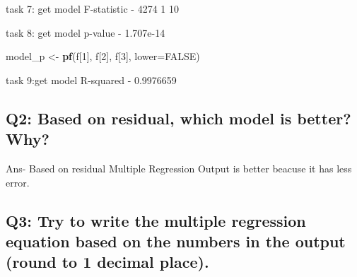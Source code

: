 \documentclass[
]{article}
\newenvironment{Shaded}{\begin{snugshade}}{\end{snugshade}}
\newcommand{\AttributeTok}[1]{\textcolor[rgb]{0.13,0.29,0.53}{#1}}
\newcommand{\ConstantTok}[1]{\textcolor[rgb]{0.56,0.35,0.01}{#1}}
\newcommand{\DecValTok}[1]{\textcolor[rgb]{0.00,0.00,0.81}{#1}}
\newcommand{\FunctionTok}[1]{\textcolor[rgb]{0.13,0.29,0.53}{\textbf{#1}}}
\newcommand{\NormalTok}[1]{#1}
\newcommand{\OtherTok}[1]{\textcolor[rgb]{0.56,0.35,0.01}{#1}}
\newcommand{\SpecialCharTok}[1]{\textcolor[rgb]{0.81,0.36,0.00}{\textbf{#1}}}
\begin{document}
task 7: get model F-statistic - 4274 1 10

\begin{Shaded}
\end{Shaded}

task 8: get model p-value - 1.707e-14

\begin{Shaded}
\begin{Highlighting}[]
\NormalTok{model\_p }\OtherTok{\textless{}{-}} \FunctionTok{pf}\NormalTok{(f[}\DecValTok{1}\NormalTok{], f[}\DecValTok{2}\NormalTok{], f[}\DecValTok{3}\NormalTok{], }\AttributeTok{lower=}\ConstantTok{FALSE}\NormalTok{) }
\end{Highlighting}
\end{Shaded}

task 9:get model R-squared - 0.9976659

\begin{Shaded}
\end{Shaded}

\hypertarget{q2-based-on-residual-which-model-is-better-why}{%
\subsection{Q2: Based on residual, which model is better?
Why?}\label{q2-based-on-residual-which-model-is-better-why}}

Ans- Based on residual Multiple Regression Output is better beacuse it
has less error.

\hypertarget{q3-try-to-write-the-multiple-regression-equation-based-on-the-numbers-in-the-output-round-to-1-decimal-place.}{%
\subsection{Q3: Try to write the multiple regression equation based on
the numbers in the output (round to 1 decimal
place).}\label{q3-try-to-write-the-multiple-regression-equation-based-on-the-numbers-in-the-output-round-to-1-decimal-place.}}
\end{document}
